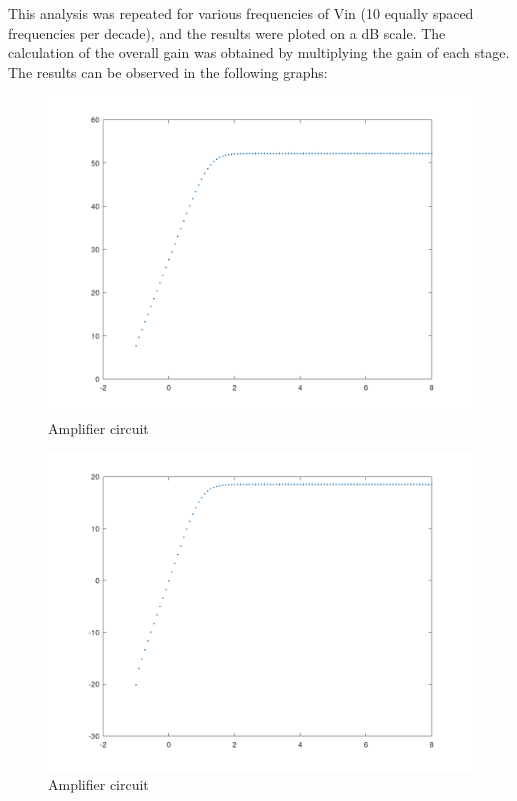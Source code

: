 This analysis was repeated for various frequencies of Vin (10 equally spaced frequencies per decade), and the results were ploted on a dB scale.
The calculation of the overall gain was obtained by multiplying the gain of each stage. The results can be observed in the following graphs:\\ 



\begin{figure} [!htb] 
  \includegraphics[width=\linewidth]{GAINVERDADEIRO.png}
  \caption{Amplifier circuit}
  \label{fig:theoplots}
  \endminipage\hfill
\end{figure}

\begin{figure} [!htb] 
  \includegraphics[width=\linewidth]{GAIN_Exprimental_R3_a_0.png}
  \caption{Amplifier circuit}
  \label{fig:theoplots}
  \endminipage\hfill
\end{figure}

\FloatBarrier




